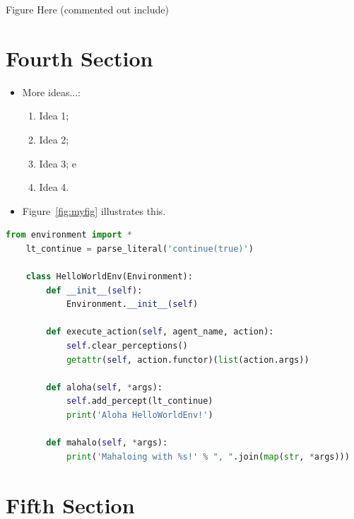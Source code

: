 \documentclass[a0,portrait]{lab-poster}
\begin{document}
\begin{multicols}{2}
\begin{center}
	\Huge Figure Here (commented out include)
	\label{fig:myfig}
\end{center}	

\columnbreak

\section*{Fourth Section}

\begin{itemize}
	\item More ideas...:
	\begin{enumerate}
		\item Idea 1;
		\item Idea 2; 
		\item Idea 3; e
		\item Idea 4.
	\end{enumerate}	
	\item Figure~\ref{fig:myfig} illustrates this.
\end{itemize}

\begin{minipage}{.235\textwidth}
	\lstset{style=codeStyle}
	\begin{lstlisting}[language=Python, label={alg:environment-example}, caption={Example of an environment definition in Python.}]
	from environment import *
	lt_continue = parse_literal('continue(true)')
	
	class HelloWorldEnv(Environment):
		def __init__(self):
			Environment.__init__(self)
		
		def execute_action(self, agent_name, action):
			self.clear_perceptions()
			getattr(self, action.functor)(list(action.args))
		
		def aloha(self, *args):
			self.add_percept(lt_continue)
			print('Aloha HelloWorldEnv!')
		
		def mahalo(self, *args):
			print('Mahaloing with %s!' % ", ".join(map(str, *args)))
	\end{lstlisting}
\end{minipage}

\section*{Fifth Section}
      

\end{multicols}
\end{document}
